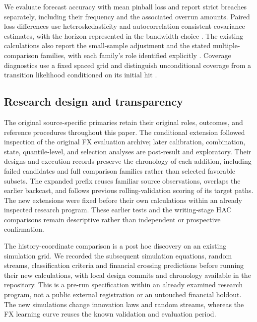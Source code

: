 \documentclass[11pt,a4paper]{article}
\begin{document}
We evaluate forecast accuracy with mean pinball loss and report strict breaches separately, including their frequency and the associated overrun amounts. Paired loss differences use heteroskedasticity and autocorrelation consistent covariance estimates, with the horizon represented in the bandwidth choice \citep{dm1995,nw1987}. The existing calculations also report the small-sample adjustment and the stated multiple-comparison families, with each family's role identified explicitly \citep{hln1997,holm1979}. Coverage diagnostics use a fixed spaced grid and distinguish unconditional coverage from a transition likelihood conditioned on its initial hit \citep{kupiec1995,christ1998}.


\subsection{Research design and transparency}

The original source-specific primaries retain their original roles, outcomes, and reference procedures throughout this paper. The conditional extension followed inspection of the original FX evaluation archive; later calibration, combination, state, quantile-level, and selection analyses are post-result and exploratory. Their designs and execution records preserve the chronology of each addition, including failed candidates and full comparison families rather than selected favorable subsets. The expanded prefix reuses familiar source observations, overlaps the earlier backcast, and follows previous rolling-validation scoring of its target paths. The new extensions were fixed before their own calculations within an already inspected research program. These earlier tests and the writing-stage HAC comparisons remain descriptive rather than independent or prospective confirmation.


The history-coordinate comparison is a post hoc discovery on an existing simulation grid. We recorded the subsequent simulation equations, random streams, classification criteria and financial crossing predictions before running their new calculations, with local design commits and chronology available in the repository. This is a pre-run specification within an already examined research program, not a public external registration or an untouched financial holdout. The new simulations change innovation laws and random streams, whereas the FX learning curve reuses the known validation and evaluation period.
\end{document}
